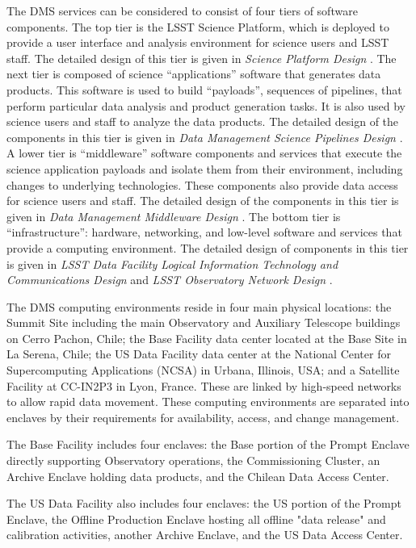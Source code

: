 \documentclass[DM,toc,lsstdraft]{lsstdoc}
\begin{document}
The DMS services can be considered to consist of four tiers of software
components. The top tier is the LSST Science Platform, which is deployed
to provide a user
interface and analysis environment for science users and LSST staff. The
detailed design of this tier is given in \textit{Science Platform Design} . The next
tier is composed of science ``applications'' software that generates
data products. This software is used to build ``payloads'', sequences of
pipelines, that perform particular data analysis and product generation
tasks. It is also used by science users and staff to analyze the data
products. The detailed design of the components in this tier is given in
\textit{Data Management Science Pipelines Design} . A lower tier is
``middleware'' software components and services that execute the science
application payloads and isolate them from their environment, including
changes to underlying technologies. These components also provide data
access for science users and staff. The detailed design of the
components in this tier is given in \textit{Data Management Middleware Design} .
The bottom tier is ``infrastructure'': hardware, networking,
and low-level software and services that provide a computing
environment. The detailed design of components in this tier is given in
\textit{LSST Data Facility Logical Information Technology and Communications Design}  and \textit{LSST Observatory Network Design} .

The DMS computing environments reside in four main physical locations:
the Summit Site including the main Observatory and Auxiliary Telescope
buildings on Cerro Pachon, Chile; the Base Facility data center located
at the Base Site in La Serena, Chile; the US Data Facility data center
at the National Center for Supercomputing Applications (NCSA) in Urbana,
Illinois, USA; and a Satellite Facility at CC-IN2P3 in Lyon,
France. These are linked by high-speed networks to allow rapid data
movement.
These computing environments are separated into enclaves by their requirements for availability, access, and change management.

The Base Facility includes four enclaves: the Base portion of the Prompt Enclave directly supporting Observatory operations, the Commissioning Cluster, an Archive Enclave holding data products, and the Chilean Data Access Center.

The US Data Facility also includes four enclaves: the US portion of the Prompt Enclave, the Offline Production Enclave hosting all offline "data release" and calibration activities, another Archive Enclave, and the US Data Access Center.
\end{document}
